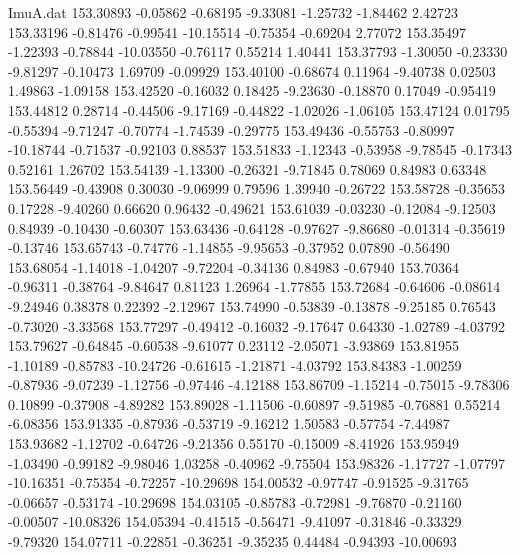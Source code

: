 \begin{filecontents}{ImuA.dat}
 153.30893   -0.05862   -0.68195   -9.33081   -1.25732   -1.84462    2.42723
 153.33196   -0.81476   -0.99541  -10.15514   -0.75354   -0.69204    2.77072
 153.35497   -1.22393   -0.78844  -10.03550   -0.76117    0.55214    1.40441
 153.37793   -1.30050   -0.23330   -9.81297   -0.10473    1.69709   -0.09929
 153.40100   -0.68674    0.11964   -9.40738    0.02503    1.49863   -1.09158
 153.42520   -0.16032    0.18425   -9.23630   -0.18870    0.17049   -0.95419
 153.44812    0.28714   -0.44506   -9.17169   -0.44822   -1.02026   -1.06105
 153.47124    0.01795   -0.55394   -9.71247   -0.70774   -1.74539   -0.29775
 153.49436   -0.55753   -0.80997  -10.18744   -0.71537   -0.92103    0.88537
 153.51833   -1.12343   -0.53958   -9.78545   -0.17343    0.52161    1.26702
 153.54139   -1.13300   -0.26321   -9.71845    0.78069    0.84983    0.63348
 153.56449   -0.43908    0.30030   -9.06999    0.79596    1.39940   -0.26722
 153.58728   -0.35653    0.17228   -9.40260    0.66620    0.96432   -0.49621
 153.61039   -0.03230   -0.12084   -9.12503    0.84939   -0.10430   -0.60307
 153.63436   -0.64128   -0.97627   -9.86680   -0.01314   -0.35619   -0.13746
 153.65743   -0.74776   -1.14855   -9.95653   -0.37952    0.07890   -0.56490
 153.68054   -1.14018   -1.04207   -9.72204   -0.34136    0.84983   -0.67940
 153.70364   -0.96311   -0.38764   -9.84647    0.81123    1.26964   -1.77855
 153.72684   -0.64606   -0.08614   -9.24946    0.38378    0.22392   -2.12967
 153.74990   -0.53839   -0.13878   -9.25185    0.76543   -0.73020   -3.33568
 153.77297   -0.49412   -0.16032   -9.17647    0.64330   -1.02789   -4.03792
 153.79627   -0.64845   -0.60538   -9.61077    0.23112   -2.05071   -3.93869
 153.81955   -1.10189   -0.85783  -10.24726   -0.61615   -1.21871   -4.03792
 153.84383   -1.00259   -0.87936   -9.07239   -1.12756   -0.97446   -4.12188
 153.86709   -1.15214   -0.75015   -9.78306    0.10899   -0.37908   -4.89282
 153.89028   -1.11506   -0.60897   -9.51985   -0.76881    0.55214   -6.08356
 153.91335   -0.87936   -0.53719   -9.16212    1.50583   -0.57754   -7.44987
 153.93682   -1.12702   -0.64726   -9.21356    0.55170   -0.15009   -8.41926
 153.95949   -1.03490   -0.99182   -9.98046    1.03258   -0.40962   -9.75504
 153.98326   -1.17727   -1.07797  -10.16351   -0.75354   -0.72257  -10.29698
 154.00532   -0.97747   -0.91525   -9.31765   -0.06657   -0.53174  -10.29698
 154.03105   -0.85783   -0.72981   -9.76870   -0.21160   -0.00507  -10.08326
 154.05394   -0.41515   -0.56471   -9.41097   -0.31846   -0.33329   -9.79320
 154.07711   -0.22851   -0.36251   -9.35235    0.44484   -0.94393  -10.00693

\end{filecontents}
